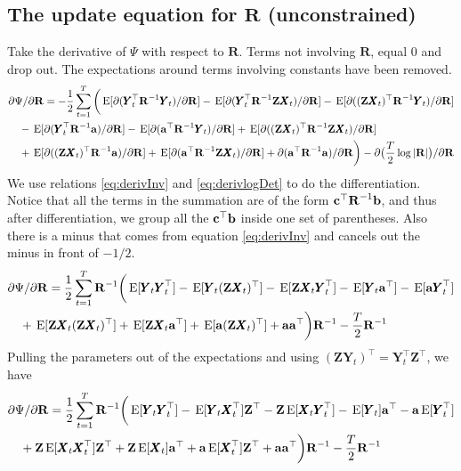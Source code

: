 \documentclass[]{article}
\def\XI{\mbox{\boldmath $\Xi$}}
\def\E{\,\textup{\textrm{E}}}
\def\RR{\mbox{$\mathbf R$}}	 \def\rr{\mbox{$\mathbf r$}} \def\Rb{\mbox{$\mathbf H$}}	\def\Rm{\mathbb{R}}
\def\XX{\mbox{$\pmb{X}$}}	\def\xx{\mbox{$\pmb{x}$}}
\def\YY{\mbox{$\pmb{Y}$}}	\def\yy{\mbox{$\pmb{y}$}}
\def\ZZ{\mbox{$\mathbf Z$}}	\def\zz{\mbox{$\mathbf z$}}	\def\Zb{\mbox{$\mathbf M$}} \def\Za{\mbox{$\mathbf N$}} \def\Zm{\XI}
\begin{document}
\subsection{The update equation for $\RR$ (unconstrained)}
Take the derivative of $\Psi$ with respect to $\RR$.  Terms not involving $\RR$, equal 0 and drop out.  The expectations around terms involving constants have been removed. 
\begin{equation}\label{eq:R.unconstrained1}
\begin{split}
&\partial\Psi/\partial\RR = -\frac{1}{2} \sum_{t=1}^T\bigg(
\E[\partial(\YY_t^\top\RR^{-1}\YY_t)/\partial\RR]
-\E[\partial(\YY_t^\top\RR^{-1}\ZZ\XX_t)/\partial\RR] -\E[\partial((\ZZ\XX_t)^\top\RR^{-1}\YY_t)/\partial\RR]\\
&\quad   - \E[\partial(\YY_t^\top\RR^{-1}\aa)/\partial\RR] 
 - \E[\partial(\aa^\top\RR^{-1}\YY_t)/\partial\RR] 
+ \E[\partial((\ZZ\XX_t)^\top\RR^{-1}\ZZ\XX_t)/\partial\RR] \\
&\quad + \E[\partial((\ZZ\XX_t)^\top\RR^{-1}\aa)/\partial\RR] 
+ \E[\partial(\aa^\top\RR^{-1}\ZZ\XX_t)/\partial\RR] 
 + \partial(\aa^\top\RR^{-1}\aa)/\partial\RR
\bigg) - \partial\big(\frac{T}{2}\log |\RR| \big)/\partial\RR 
\end{split}
\end{equation}
We use relations \eqref{eq:derivInv} and \eqref{eq:derivlogDet} to do the differentiation. Notice that all the terms in the summation are of the form $\cc^\top\RR^{-1}\bb$, and thus after differentiation, we group all the $\mbox{$\mathbf c$}^\top\mbox{$\mathbf b$}$ inside one set of parentheses. Also there is a minus that comes from equation \ref{eq:derivInv} and cancels out the minus in front of $-1/2$.
\begin{equation}\label{eq:R.unconstrained2}
\begin{split}
&\partial\Psi/\partial\RR = \frac{1}{2} \sum_{t=1}^T \RR^{-1} \bigg(  
 \E[\YY_t\YY_t^\top] -\E[\YY_t(\ZZ\XX_t)^\top] - \E[\ZZ\XX_t\YY_t^\top ] -  \E[\YY_t\aa^\top]  -  \E[\aa\YY_t^\top]\\
&\quad    + \E[ \ZZ\XX_t(\ZZ\XX_t)^\top ] + \E[\ZZ\XX_t\aa^\top] + \E[ \aa(\ZZ\XX_t)^\top ] 
 + \aa\aa^\top \bigg)\RR^{-1} - \frac{T}{2}\RR^{-1} 
\end{split}
\end{equation}
Pulling the parameters out of the expectations and using $(\ZZ\YY_t)^\top = \YY_t^\top\ZZ^\top$, we have
\begin{equation}\label{eq:R.unconstrained3}
\begin{split}
&\partial\Psi/\partial\RR = \frac{1}{2} \sum_{t=1}^T \RR^{-1} \bigg(  
 \E[\YY_t\YY_t^\top] -\E[\YY_t\XX_t^\top ]\ZZ^\top - \ZZ\E[\XX_t\YY_t^\top] 
 -  \E[\YY_t]\aa^\top - \aa\E[\YY_t^\top] \\
&\quad  + \ZZ\E[ \XX_t\XX_t^\top ]\ZZ^\top + \ZZ\E[\XX_t]\aa^\top + \aa\E[\XX_t^\top ]\ZZ^\top 
 + \aa\aa^\top \bigg)\RR^{-1} - \frac{T}{2}\RR^{-1} 
\end{split}
\end{equation}
\end{document}
